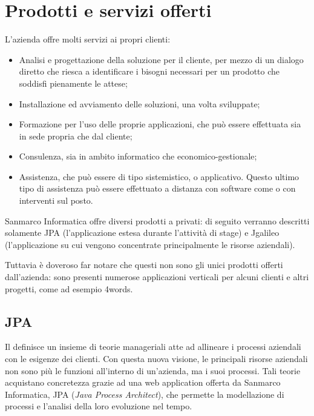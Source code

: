 \section{Prodotti e servizi offerti}

L'azienda offre molti servizi ai propri clienti:

\begin{itemize}
	\item Analisi e progettazione della soluzione per il cliente, per mezzo di un
	dialogo diretto che riesca a identificare i bisogni necessari per un prodotto
	che soddisfi pienamente le attese;
	\item Installazione ed avviamento delle soluzioni, una volta sviluppate;
	\item Formazione per l'uso delle proprie applicazioni, che può essere
	effettuata sia in sede propria che dal cliente;
	\item Consulenza, sia in ambito informatico che economico-gestionale;
	\item Assistenza, che può essere di tipo sistemistico,  o
	applicativo. Questo ultimo tipo di assistenza può essere effettuato a distanza
	con software come  o con interventi sul posto.
\end{itemize}

Sanmarco Informatica offre diversi prodotti a privati: di seguito verranno
descritti solamente JPA (l'applicazione estesa durante l'attività di stage) e
Jgalileo (l'applicazione su cui vengono concentrate principalmente le risorse
aziendali).

Tuttavia è doveroso far notare che questi non sono gli unici prodotti offerti
dall'azienda: sono presenti numerose applicazioni verticali per alcuni clienti
e altri progetti, come ad esempio 4words.

\subsection{JPA}

Il  definisce un insieme di teorie manageriali atte ad allineare i
processi aziendali con le esigenze dei clienti. Con questa nuova visione, le
principali risorse aziendali non sono più le funzioni all'interno di
un'azienda, ma i suoi processi. Tali teorie acquistano concretezza grazie ad
una web application offerta da Sanmarco Informatica, JPA (\emph{Java Process
Architect}), che permette la modellazione di processi e l'analisi della loro
evoluzione nel tempo.

